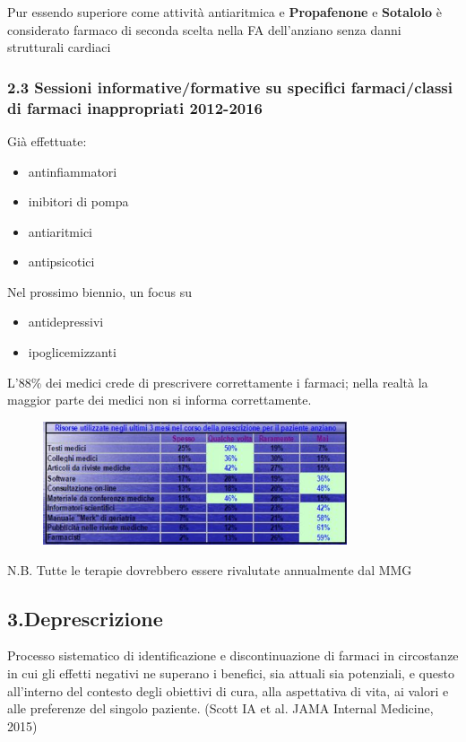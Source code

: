   Pur essendo superiore come attività antiaritmica e
  \textbf{Propafenone} e \textbf{Sotalolo} è considerato farmaco di
  seconda scelta nella FA dell'anziano senza danni strutturali cardiaci

  \subsubsection{2.3 Sessioni informative/formative su specifici farmaci/classi di farmaci inappropriati 2012-2016}
  Già effettuate:
  
\begin{itemize}
\item antinfiammatori
\item inibitori di pompa
\item antiaritmici
\item antipsicotici
\end{itemize}

  Nel prossimo biennio, un focus su
  
\begin{itemize}
\item antidepressivi
\item ipoglicemizzanti
\end{itemize}

  L'88\% dei medici crede di prescrivere correttamente i farmaci; nella
  realtà la maggior parte dei medici non si informa correttamente.

  \begin{figure}[!ht]
\centering
	\includegraphics[width=0.8\textwidth]{37/image4.jpg}
	\end{figure}

  N.B. Tutte le terapie dovrebbero essere rivalutate annualmente dal MMG

  \subsection{3.Deprescrizione}
  
  Processo sistematico di identificazione e discontinuazione di farmaci
  in circostanze in cui gli effetti negativi ne superano i benefici, sia
  attuali sia potenziali, e questo all'interno del contesto degli
  obiettivi di cura, alla aspettativa di vita, ai valori e alle
  preferenze del singolo paziente. (Scott IA et al. JAMA Internal
  Medicine, 2015)

